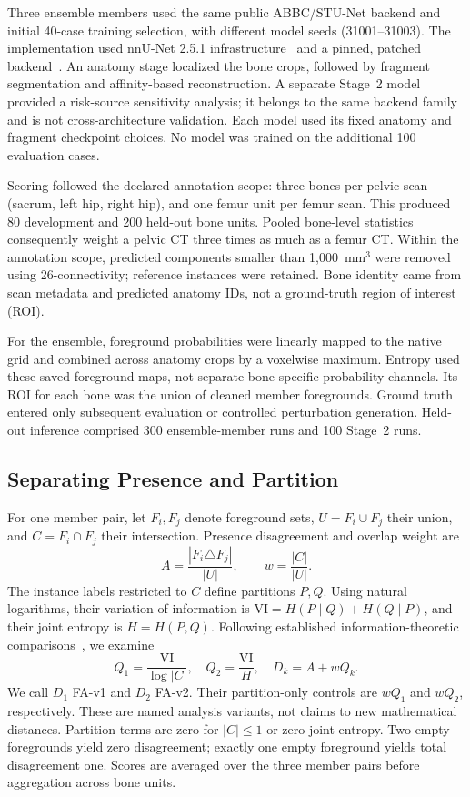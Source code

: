 \documentclass[conference]{IEEEtran}
\begin{document}
Three ensemble members used the same public ABBC/STU-Net backend and initial 40-case training selection, with different model seeds (31001--31003). The implementation used nnU-Net 2.5.1 infrastructure~\cite{isensee2021} and a pinned, patched backend~\cite{abbc}. An anatomy stage localized the bone crops, followed by fragment segmentation and affinity-based reconstruction. A separate Stage~2 model provided a risk-source sensitivity analysis; it belongs to the same backend family and is not cross-architecture validation. Each model used its fixed anatomy and fragment checkpoint choices. No model was trained on the additional 100 evaluation cases.

Scoring followed the declared annotation scope: three bones per pelvic scan (sacrum, left hip, right hip), and one femur unit per femur scan. This produced 80 development and 200 held-out bone units. Pooled bone-level statistics consequently weight a pelvic CT three times as much as a femur CT. Within the annotation scope, predicted components smaller than 1,000~mm$^3$ were removed using 26-connectivity; reference instances were retained. Bone identity came from scan metadata and predicted anatomy IDs, not a ground-truth region of interest (ROI).

For the ensemble, foreground probabilities were linearly mapped to the native grid and combined across anatomy crops by a voxelwise maximum. Entropy used these saved foreground maps, not separate bone-specific probability channels. Its ROI for each bone was the union of cleaned member foregrounds. Ground truth entered only subsequent evaluation or controlled perturbation generation. Held-out inference comprised 300 ensemble-member runs and 100 Stage~2 runs.

\subsection{Separating Presence and Partition}
For one member pair, let $F_i,F_j$ denote foreground sets, $U=F_i\cup F_j$ their union, and $C=F_i\cap F_j$ their intersection. Presence disagreement and overlap weight are
\begin{equation}
 A=\frac{|F_i\triangle F_j|}{|U|},\qquad w=\frac{|C|}{|U|}.
\end{equation}
The instance labels restricted to $C$ define partitions $P,Q$. Using natural logarithms, their variation of information is $\mathrm{VI}=H(P\mid Q)+H(Q\mid P)$, and their joint entropy is $H=H(P,Q)$. Following established information-theoretic comparisons~\cite{vinh2010}, we examine
\begin{equation}
 Q_1=\frac{\mathrm{VI}}{\log |C|},\quad Q_2=\frac{\mathrm{VI}}{H},\quad D_k=A+wQ_k.
\end{equation}
We call $D_1$ FA-v1 and $D_2$ FA-v2. Their partition-only controls are $wQ_1$ and $wQ_2$, respectively. These are named analysis variants, not claims to new mathematical distances. Partition terms are zero for $|C|\leq1$ or zero joint entropy. Two empty foregrounds yield zero disagreement; exactly one empty foreground yields total disagreement one. Scores are averaged over the three member pairs before aggregation across bone units.
\end{document}
